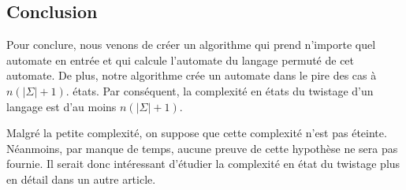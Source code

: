 \subsection{Conclusion}

Pour conclure, nous venons de créer un algorithme qui prend n’importe quel
automate en entrée et qui calcule l’automate du langage permuté de cet
automate. De plus, notre algorithme crée un automate dans le pire des cas à
\(n(\lvert \Sigma \rvert + 1)\). états. Par conséquent, la complexité en états
du twistage d’un langage est d’au moins \(n(\lvert \Sigma \rvert + 1)\).

\vphantom{}

Malgré la petite complexité, on suppose que cette complexité n'est pas
éteinte. Néanmoins, par manque de temps, aucune preuve de cette hypothèse ne
sera pas fournie. Il serait donc intéressant d'étudier la complexité en état
du twistage plus en détail dans un autre article.
